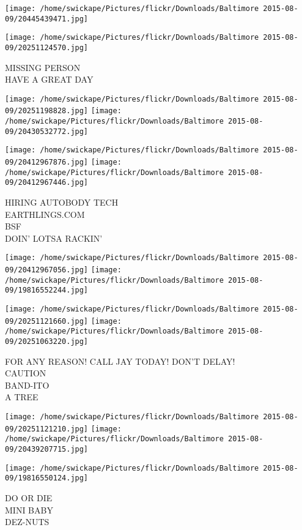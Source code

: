 \documentclass[10pt,letterpaper]{article}
\begin{document}
\texttt{[image: /home/swickape/Pictures/flickr/Downloads/Baltimore 2015-08-09/20445439471.jpg]}

\vspace{0.25in}
\texttt{[image: /home/swickape/Pictures/flickr/Downloads/Baltimore 2015-08-09/20251124570.jpg]}

MISSING PERSON\\
HAVE A GREAT DAY\\
\pagebreak

\texttt{[image: /home/swickape/Pictures/flickr/Downloads/Baltimore 2015-08-09/20251198828.jpg]}
\texttt{[image: /home/swickape/Pictures/flickr/Downloads/Baltimore 2015-08-09/20430532772.jpg]}

\texttt{[image: /home/swickape/Pictures/flickr/Downloads/Baltimore 2015-08-09/20412967876.jpg]}
\texttt{[image: /home/swickape/Pictures/flickr/Downloads/Baltimore 2015-08-09/20412967446.jpg]}

HIRING AUTOBODY TECH\\
EARTHLINGS.COM\\
BSF\\
DOIN' LOTSA RACKIN'\\
\pagebreak

\texttt{[image: /home/swickape/Pictures/flickr/Downloads/Baltimore 2015-08-09/20412967056.jpg]}
\texttt{[image: /home/swickape/Pictures/flickr/Downloads/Baltimore 2015-08-09/19816552244.jpg]}

\texttt{[image: /home/swickape/Pictures/flickr/Downloads/Baltimore 2015-08-09/20251121660.jpg]}
\texttt{[image: /home/swickape/Pictures/flickr/Downloads/Baltimore 2015-08-09/20251063220.jpg]}

FOR ANY REASON!  CALL JAY TODAY!  DON'T DELAY!\\
CAUTION\\
BAND{-}ITO\\
A TREE\\
\pagebreak

\texttt{[image: /home/swickape/Pictures/flickr/Downloads/Baltimore 2015-08-09/20251121210.jpg]}
\texttt{[image: /home/swickape/Pictures/flickr/Downloads/Baltimore 2015-08-09/20439207715.jpg]}

\texttt{[image: /home/swickape/Pictures/flickr/Downloads/Baltimore 2015-08-09/19816550124.jpg]}

DO OR DIE\\
MINI BABY\\
DEZ{-}NUTS\\
\pagebreak
\end{document}
